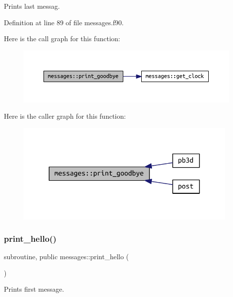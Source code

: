 Prints last messag. 



Definition at line 89 of file messages.\+f90.

Here is the call graph for this function\+:\nopagebreak
\begin{figure}[H]
\begin{center}
\leavevmode
\includegraphics[width=350pt]{namespacemessages_a5d3f456913230bdf985c363e8cee8489_cgraph}
\end{center}
\end{figure}
Here is the caller graph for this function\+:\nopagebreak
\begin{figure}[H]
\begin{center}
\leavevmode
\includegraphics[width=312pt]{namespacemessages_a5d3f456913230bdf985c363e8cee8489_icgraph}
\end{center}
\end{figure}
\mbox{\label{namespacemessages_a60c95b4c352b0087f32ef87279da49ca}} 
\subsubsection{\texorpdfstring{print\+\_\+hello()}{print\_hello()}}
{\footnotesize\ttfamily subroutine, public messages\+::print\+\_\+hello (\begin{DoxyParamCaption}{ }\end{DoxyParamCaption})}



Prints first message. 



